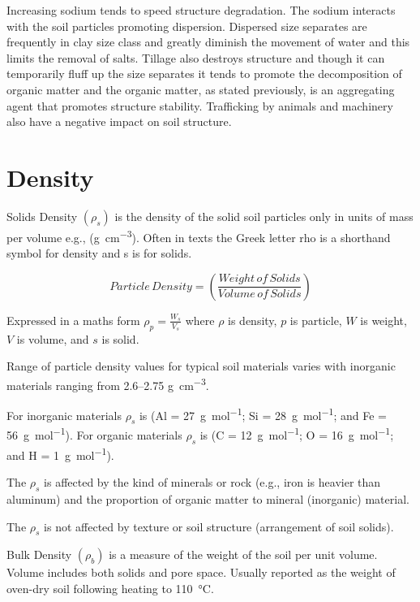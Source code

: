 \documentclass[letterpaper, 12pt]{article}
\begin{document}
Increasing sodium tends to speed structure degradation. The sodium interacts with the soil particles promoting dispersion. Dispersed size separates are frequently in clay size class and greatly diminish the movement of water and this limits the removal of salts. Tillage also destroys structure and though it can temporarily fluff up the size separates it tends to promote the decomposition of organic matter and the organic matter, as stated previously, is an aggregating agent that promotes structure stability. Trafficking by animals and machinery also have a negative impact on soil structure.
    
\section{Density}
\label{density}
    
Solids Density $\left(\rho_s\right)$ is the density of the solid soil particles only in units of mass per volume e.g., (\unit{\gram\per\cubic\centi\metre}). Often in texts the Greek letter rho  is a shorthand symbol for density and s is for solids.

\begin{equation}
    Particle\,Density = \left(\frac{Weight\,of\,Solids}{Volume\,of\,Solids}\right)   
\end{equation}

Expressed in a maths form $\rho_p =\frac{W_s}{V_s}$ where $\rho$ is density, $p$ is particle, $W$ is weight, $V$ is volume, and $s$ is solid.

Range of particle density values for typical soil materials varies with inorganic materials ranging from \numrange{2.6}{2.75} \unit{\gram\per\cubic\centi\metre}.

For inorganic materials $\rho_s$ is  (Al = \qty[per-mode=symbol]{27}{\gram\per\mole}; Si =  \qty[per-mode=symbol]{28}{\gram\per\mole}; and Fe = \qty[per-mode = symbol]{56}{\gram\per\mole}). For organic materials $\rho_s$ is  (C = \qty[per-mode = symbol]{12}{\gram\per\mole}; O = \qty[per-mode=symbol]{16}{\gram\per\mole}; and H = \qty[per-mode=symbol]{1}{\gram\per\mole}).

The $\rho_s$ is affected by the kind of minerals or rock (e.g., iron is heavier than aluminum) and the proportion of organic matter to mineral (inorganic) material.

The $\rho_s$ is not affected by texture or soil structure (arrangement of soil solids).

Bulk Density $\left(\rho_b\right)$ is a measure of the weight of the soil per unit volume. Volume includes both solids and pore space. Usually reported as the weight of oven-dry soil following heating to \qty{110}{\degreeCelsius}.
\end{document}
